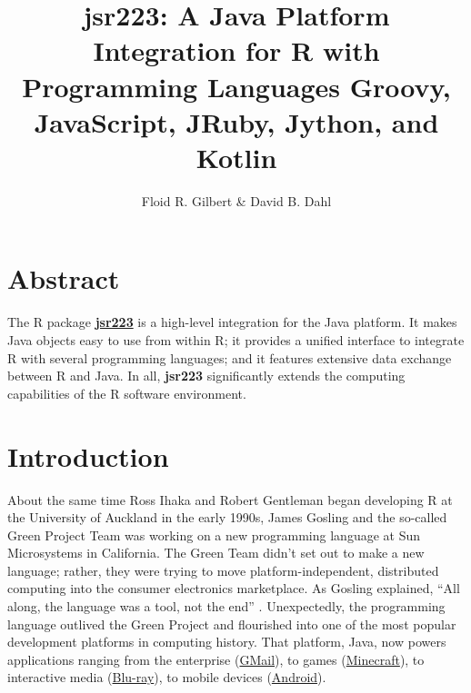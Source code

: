\documentclass[
article,
11pt, %
a4paper, %
oneside, %
headinclude,footinclude, %
]{scrartcl}
\title{\normalfont jsr223: A Java Platform Integration for R with Programming Languages Groovy, JavaScript, JRuby, Jython, and Kotlin}
\author{Floid R. Gilbert \& David B. Dahl}
\date{}
\theoremstyle{definition} %
\theoremstyle{plain} %
\theoremstyle{remark} %
\newcommand{\pkg}[1]{\textbf{#1}}
\newcommand{\CRANpkg}[1]{\href{https://CRAN.R-project.org/package=#1}{\pkg{#1}}}
\begin{document}
\renewcommand{\sectionmark}[1]{\markright{#1}} %
\lehead{\mbox{\llap{\small\thepage\kern1em\color{halfgray} \vline}\color{halfgray}\hspace{0.5em}\rightmark\hfil}} %

\pagestyle{scrheadings}

\maketitle

\section*{Abstract} %

The R package \CRANpkg{jsr223} is a high-level integration for the Java platform. It makes Java objects easy to use from within R; it provides a unified interface to integrate R with several programming languages; and it features extensive data exchange between R and Java. In all, \pkg{jsr223} significantly extends the computing capabilities of the R software environment.
\clearpage

\setcounter{tocdepth}{2}

\tableofcontents

\newpage

\section{Introduction}

About the same time Ross Ihaka and Robert Gentleman began developing R at the University of Auckland in the early 1990s, James Gosling and the so-called Green Project Team was working on a new programming language at Sun Microsystems in California. The Green Team didn't set out to make a new language; rather, they were trying to move platform-independent, distributed computing into the consumer electronics marketplace. As Gosling explained, ``All along, the language was a tool, not the end'' \citep{javainsidestory}. Unexpectedly, the programming language outlived the Green Project and flourished into one of the most popular development platforms in computing history. That platform, Java, now powers applications ranging from the enterprise (\href{https://www.google.com/gmail/about/}{GMail}), to games (\href{https://minecraft.net}{Minecraft}), to interactive media (\href{https://en.wikipedia.org/wiki/Blu-ray}{Blu-ray}), to mobile devices (\href{https://www.android.com/}{Android}).
\end{document}

